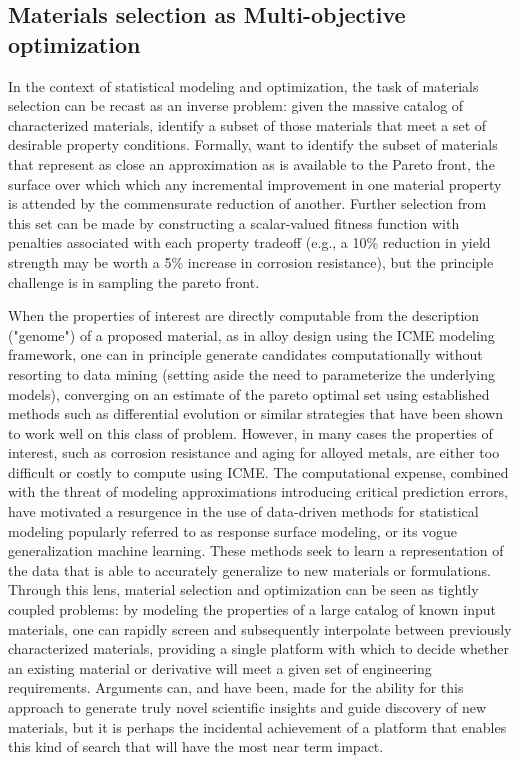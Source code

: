 \subsection{Materials selection as Multi-objective optimization}
In the context of statistical modeling and optimization, the task of materials selection can be recast as an inverse problem: given the massive catalog of characterized materials, identify a subset of those materials that meet a set of desirable property conditions.
Formally, want to identify the subset of materials that represent as close an approximation as is available to the Pareto front\cite{Sirisalee2004,Fonseca1993}, the surface over which which any incremental improvement in one material property is attended by the commensurate reduction of another. 
Further selection from this set can be made by constructing a scalar-valued fitness function with penalties associated with each property tradeoff (e.g., a 10\% reduction in yield strength may be worth a 5\% increase in corrosion resistance), but the principle challenge is in sampling the pareto front.

When the properties of interest are directly computable from the description ("genome") of a proposed material, as in alloy design using the ICME modeling framework, one can in principle generate candidates computationally without resorting to data mining (setting aside the need to parameterize the underlying models), converging on an estimate of the pareto optimal set using established methods such as differential evolution or similar strategies that have been shown to work well on this class of problem\cite{Zhang2015}.
However, in many cases the properties of interest, such as corrosion resistance and aging for alloyed metals\cite{Konter2016}, are either too difficult or costly to compute using ICME. 
The computational expense, combined with the threat of modeling approximations introducing critical prediction errors, have motivated a resurgence in the use of data-driven methods for statistical modeling popularly referred to as response surface modeling, or its vogue generalization machine learning\cite{Rajan2013,Agrawal2014,Suh2006,Jee2000}.
These methods seek to learn a representation of the data that is able to accurately generalize to new materials or formulations. 
Through this lens, material selection and optimization can be seen as tightly coupled problems: by modeling the properties of a large catalog of known input materials, one can rapidly screen and subsequently interpolate between previously characterized materials, providing a single platform with which to decide whether an existing material or derivative will meet a given set of engineering requirements.
Arguments can, and have been\cite{Rajan2005,Hemanth2011}, made for the ability for this approach to generate truly novel scientific insights and guide discovery of new materials, but it is perhaps the incidental achievement of a platform that enables this kind of search that will have the most near term impact.

